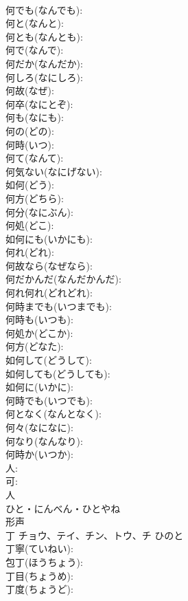 \documentclass[8pt]{extreport}
\begin{document}
\begin{CJK}{UTF8}{min}
\\	何でも(なんでも): 
\\	何と(なんと): 
\\	何とも(なんとも): 
\\	何で(なんで): 
\\	何だか(なんだか): 
\\	何しろ(なにしろ): 
\\	何故(なぜ): 
\\	何卒(なにとぞ): 
\\	何も(なにも): 
\\	何の(どの): 
\\	何時(いつ): 
\\	何て(なんて): 
\\	何気ない(なにげない): 
\\	如何(どう): 
\\	何方(どちら): 
\\	何分(なにぶん): 
\\	何処(どこ): 
\\	如何にも(いかにも): 
\\	何れ(どれ): 
\\	何故なら(なぜなら): 
\\	何だかんだ(なんだかんだ): 
\\	何れ何れ(どれどれ): 
\\	何時までも(いつまでも): 
\\	何時も(いつも): 
\\	何処か(どこか): 
\\	何方(どなた): 
\\	如何して(どうして): 
\\	如何しても(どうしても): 
\\	如何に(いかに): 
\\	何時でも(いつでも): 
\\	何となく(なんとなく): 
\\	何々(なになに): 
\\	何なり(なんなり): 
\\	何時か(いつか): 
\\	人: 
\\	可: 
\\	人	
\\	ひと・にんべん・ひとやね	
\\	形声 
\\	丁	チョウ、テイ、チン、トウ、チ	ひのと		
\\	丁寧(ていねい): 
\\	包丁(ほうちょう): 
\\	丁目(ちょうめ): 
\\	丁度(ちょうど): 

\end{CJK}
\end{document}
